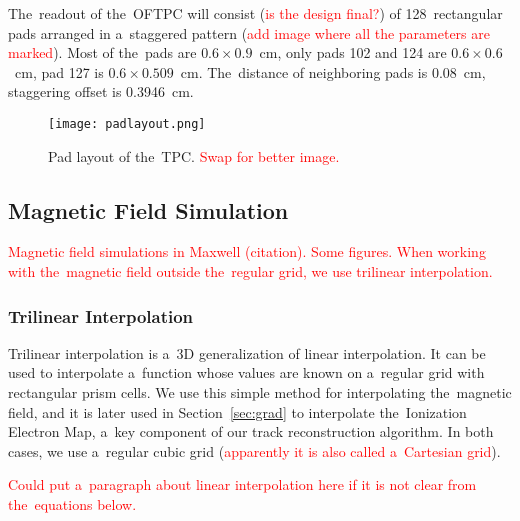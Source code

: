 			The~readout of the~\ac{OFTPC} will consist (\textcolor{red}{is the design final?}) of 128~rectangular pads arranged in a~staggered pattern (\textcolor{red}{add image where all the parameters are marked}). Most of the~pads are $0.6 \times 0.9$~cm, only pads 102 and 124 are $0.6 \times 0.6$~cm, pad 127 is $0.6 \times 0.509$~cm. The~distance of neighboring pads is 0.08~cm, staggering offset is 0.3946~cm.
		
			\begin{figure}[H]
				\centering
				\texttt{[image: padlayout.png]}
				\caption{Pad layout of the~TPC. \textcolor{red}{Swap for better image.}}
				\label{fig:padlayout}
			\end{figure}
	
	\subsection{Magnetic Field Simulation}
	\label{sec:mag}
		\textcolor{red}{Magnetic field simulations in Maxwell (citation). Some figures. When working with the~magnetic field outside the~regular grid, we use trilinear interpolation.}
	
		\subsubsection{Trilinear Interpolation}
		\label{sec:trilin}
			Trilinear interpolation is a~3D generalization of linear interpolation. It can be used to interpolate a~function whose values are known on a~regular grid with rectangular prism cells. We use this simple method for interpolating the~magnetic field, and it is later used in Section~\ref{sec:grad} to interpolate the~Ionization Electron Map, a~key component of our track reconstruction algorithm. In both cases, we use a~regular cubic grid (\textcolor{red}{apparently it is also called a~Cartesian grid}).
			
			\textcolor{red}{Could put a~paragraph about linear interpolation here if it is not clear from the~equations below.}
			
